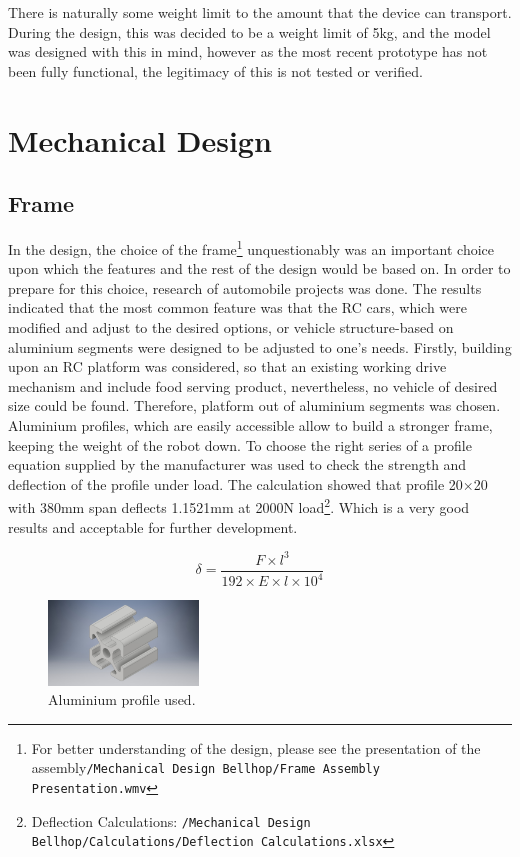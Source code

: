 \documentclass[11pt]{article}
\begin{document}
There is naturally some weight limit to the amount that the device can transport. During the design, this was decided to be a weight limit of 5kg, and the model was designed with this in mind, however as the most recent prototype has not been fully functional, the legitimacy of this is not tested or verified.

\newpage
\section{Mechanical Design}
\subsection*{Frame}
In the design, the choice of the frame\footnote{For better understanding of the design, please see the presentation of the assembly\texttt{/Mechanical Design Bellhop/Frame Assembly Presentation.wmv}} unquestionably was an important choice upon which the features and the rest of the design would be based on. In order to prepare for this choice, research of automobile projects was done. The results indicated that the most common feature was that the RC cars, which were modified and adjust to the desired options, or vehicle structure-based on aluminium segments were designed to be adjusted to one's needs. Firstly, building upon an RC platform was considered, so that an existing working drive mechanism and include food serving product, nevertheless, no vehicle of desired size could be found. Therefore, platform out of aluminium segments was chosen. Aluminium profiles, which are easily accessible allow to build a stronger frame, keeping the weight of the robot down. To choose the right series of a profile equation supplied by the manufacturer was used to check the strength and deflection of the profile under load. The calculation showed that profile 20$\times$20 with 380mm span deflects 1.1521mm at 2000N load\footnote{Deflection Calculations: \texttt{/Mechanical Design Bellhop/Calculations/Deflection Calculations.xlsx}}. Which is a very good results and acceptable for further development.

$$\delta=\frac{F\times l^3}{192\times E\times l\times 10^4}$$


\begin{figure}
  \includegraphics[width=4cm]{profile}
  \caption{Aluminium profile used.}
  \label{profile}
\end{figure}
\end{document}
